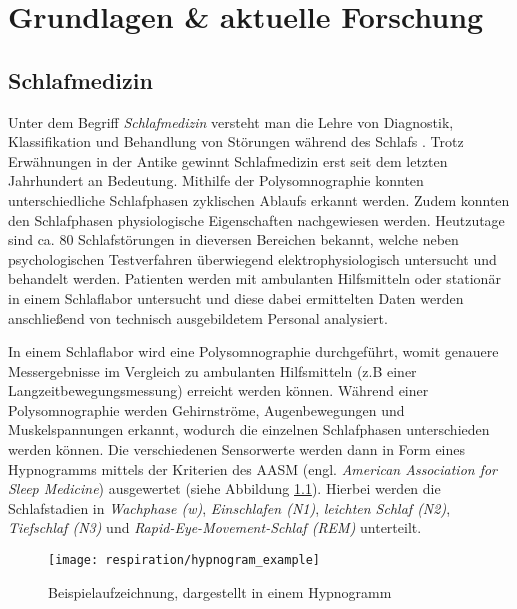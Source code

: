 
\chapter{Grundlagen \& aktuelle Forschung}
\label{ch:Basics}

\section{Schlafmedizin}
\label{ch:Basics:se:schlafmedizin}
Unter dem Begriff \textit{Schlafmedizin} versteht man die Lehre von Diagnostik, Klassifikation und Behandlung von Störungen während des Schlafs \cite{croenleinSchlafmedizin1x1Praxisorientiertes2017}. 
Trotz Erwähnungen in der Antike gewinnt Schlafmedizin erst seit dem letzten Jahrhundert an Bedeutung.
Mithilfe der Polysomnographie konnten unterschiedliche Schlafphasen zyklischen Ablaufs erkannt werden.
Zudem konnten den Schlafphasen physiologische Eigenschaften nachgewiesen werden.
Heutzutage sind ca. 80 Schlafstörungen in dieversen Bereichen bekannt, welche neben psychologischen Testverfahren überwiegend elektrophysiologisch untersucht und behandelt werden.
Patienten werden mit ambulanten Hilfsmitteln oder stationär in einem Schlaflabor untersucht und diese dabei ermittelten Daten werden anschließend von technisch ausgebildetem Personal analysiert.

In einem Schlaflabor wird eine Polysomnographie durchgeführt, womit genauere Messergebnisse im Vergleich zu ambulanten Hilfsmitteln (z.B einer Langzeitbewegungsmessung) erreicht werden können.
Während einer Polysomnographie werden Gehirnströme, Augenbewegungen und Muskelspannungen erkannt, wodurch die einzelnen Schlafphasen unterschieden werden können.
Die verschiedenen Sensorwerte werden dann in Form eines Hypnogramms mittels der Kriterien des AASM (engl. \textit{American Association for Sleep Medicine}) ausgewertet (siehe Abbildung \ref{hypnogram_example}). 
Hierbei werden die Schlafstadien in \textit{Wachphase (w)}, \textit{Einschlafen (N1)}, \textit{leichten Schlaf (N2)}, \textit{Tiefschlaf (N3)} und \textit{Rapid-Eye-Movement-Schlaf (REM)} unterteilt.

\begin{figure}[ht]
    \centering
    \texttt{[image: respiration/hypnogram\_example]}
    \caption{Beispielaufzeichnung, dargestellt in einem Hypnogramm \cite{stuckPraxisSchlafmedizinDiagnostik2018}}
    \label{hypnogram_example}
\end{figure}

